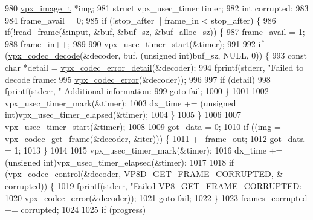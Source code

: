 \begin{DoxyCodeInclude}
{{{{{{{{{{{{{{{{{{{{{{{{{{{{{{{{{{{{{980     \hyperlink{structvpx__image}{vpx\_image\_t}    *img;
981     \textcolor{keyword}{struct }vpx\_usec\_timer timer;
982     \textcolor{keywordtype}{int}                   corrupted;
983 
984     frame\_avail = 0;
985     \textcolor{keywordflow}{if} (!stop\_after || frame\_in < stop\_after) \{
986       \textcolor{keywordflow}{if}(!read\_frame(&input, &buf, &buf\_sz, &buf\_alloc\_sz)) \{
987         frame\_avail = 1;
988         frame\_in++;
989 
990         vpx\_usec\_timer\_start(&timer);
991 
992         \textcolor{keywordflow}{if} (\hyperlink{group__decoder_ga3441e157a7a69108bca9a069f2ee8e0d}{vpx\_codec\_decode}(&decoder, buf, (\textcolor{keywordtype}{unsigned} \textcolor{keywordtype}{int})buf\_sz, NULL, 0)) \{
993           \textcolor{keyword}{const} \textcolor{keywordtype}{char} *detail = \hyperlink{group__codec_ga29273cb552ed1a437fe263c4a0a54300}{vpx\_codec\_error\_detail}(&decoder);
994           fprintf(stderr, \textcolor{stringliteral}{"Failed to decode frame: %
995                   \hyperlink{group__codec_ga4d265df00d42b36a4f0e3eb83fc22c5e}{vpx\_codec\_error}(&decoder));
996 
997           \textcolor{keywordflow}{if} (detail)
998             fprintf(stderr, \textcolor{stringliteral}{"  Additional information: %
999           \textcolor{keywordflow}{goto} fail;
1000         \}
1001 
1002         vpx\_usec\_timer\_mark(&timer);
1003         dx\_time += (\textcolor{keywordtype}{unsigned} int)vpx\_usec\_timer\_elapsed(&timer);
1004       \}
1005     \}
1006 
1007     vpx\_usec\_timer\_start(&timer);
1008 
1009     got\_data = 0;
1010     \textcolor{keywordflow}{if} ((img = \hyperlink{group__decoder_ga0e231c3a5ce445fdb2268d741da97500}{vpx\_codec\_get\_frame}(&decoder, &iter))) \{
1011       ++frame\_out;
1012       got\_data = 1;
1013     \}
1014 
1015     vpx\_usec\_timer\_mark(&timer);
1016     dx\_time += (\textcolor{keywordtype}{unsigned} int)vpx\_usec\_timer\_elapsed(&timer);
1017 
1018     \textcolor{keywordflow}{if} (\hyperlink{group__codec_gac1b91e04698c1bd4c0a2b8aa85b08cd2}{vpx\_codec\_control}(&decoder, \hyperlink{group__vp8__decoder_ggaf9dd3f2e6d1412106ee791af768e57c1af9f82d9e7930e6a2244b30b031b79599}{VP8D\_GET\_FRAME\_CORRUPTED}, &
      corrupted)) \{
1019       fprintf(stderr, \textcolor{stringliteral}{"Failed VP8\_GET\_FRAME\_CORRUPTED: %
1020               \hyperlink{group__codec_ga4d265df00d42b36a4f0e3eb83fc22c5e}{vpx\_codec\_error}(&decoder));
1021       \textcolor{keywordflow}{goto} fail;
1022     \}
1023     frames\_corrupted += corrupted;
1024 
1025     \textcolor{keywordflow}{if} (progress)
}}}}}}}}}}}}}}}}}}}}}}}}}}}}}}}}}}}}}}}}
\end{DoxyCodeInclude}
